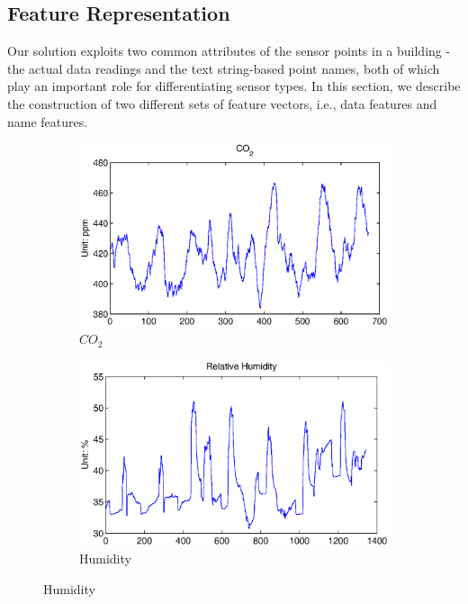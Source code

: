 \subsection{Feature Representation}\label{feature}
Our solution exploits two common attributes of the sensor points in a building - the actual data readings and the text string-based point names, both of which play an important role for differentiating sensor types.
In this section, we describe the construction of two different sets of feature vectors, i.e., data features and name features.

\begin{figure}[ht!]
\centering
  \begin{subfigure}{0.32\textwidth}
                \centering
    \includegraphics[width=\textwidth]{./fig/co2.eps}
                \caption{$CO_{2}$}
  \end{subfigure}
  \begin{subfigure}{0.32\textwidth}
                \centering
    \includegraphics[width=\textwidth]{./fig/rh.eps}
                \caption{Humidity}

\end{subfigure}
\end{figure}
